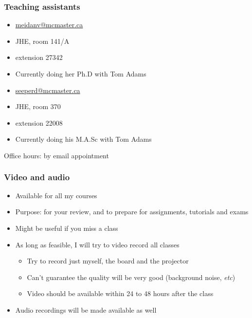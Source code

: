 \begin{frame}\frametitle{Teaching assistants}
	\vspace{12pt}
	{\color{myGreen}{Vida Meidanshahi}}
	\begin{itemize}
		\item	\url{meidanv@mcmaster.ca}
		\item	JHE, room 141/A
		\item	extension 27342
		\item	Currently doing her Ph.D with Tom Adams
	\end{itemize}
	
	\vspace{24pt}
	
	{\color{myGreen}{Dominik Seepersad}}
	\begin{itemize}
		\item	\url{seeperd@mcmaster.ca}
		\item	JHE, room 370
		\item	extension 22008
		\item	Currently doing his M.A.Sc with Tom Adams
	\end{itemize}
	\vspace{24pt}
	Office hours: by email appointment
\end{frame}

\begin{frame}\frametitle{Video and audio}
	\begin{itemize}
		\item	Available for all my courses
		\item	Purpose: for your review, and to prepare for assignments, tutorials and exams 
		\item	Might be useful if you miss a class
		\item	As long as feasible, I will try to video record all classes
		\begin{itemize}
			\item	Try to record just myself, the board and the projector 
			\item	Can't guarantee the quality will be very good (background noise, \emph{etc}) 
			\item	Video should be available within 24 to 48 hours after the class 
		\end{itemize}
		\item	Audio recordings will be made available as well 
	\end{itemize}
\end{frame}

